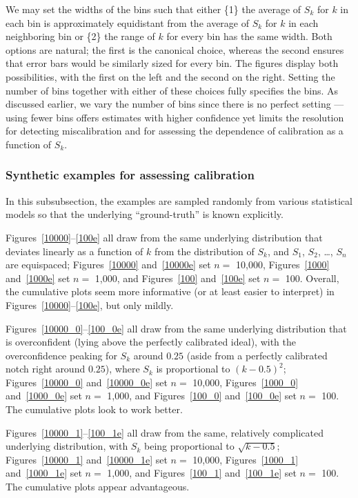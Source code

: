 \documentclass{article}
\begin{document}
We may set the widths of the bins such that either
\{1\} the average of $S_k$ for $k$ in each bin is approximately equidistant
from the average of $S_k$ for $k$ in each neighboring bin or
\{2\} the range of $k$ for every bin has the same width.
Both options are natural; the first is the canonical choice,
whereas the second ensures that error bars would be similarly sized
for every bin. The figures display both possibilities,
with the first on the left and the second on the right.
Setting the number of bins together with either of these choices
fully specifies the bins. As discussed earlier, we vary the number of bins
since there is no perfect setting --- using fewer bins offers estimates
with higher confidence yet limits the resolution for detecting miscalibration
and for assessing the dependence of calibration as a function of $S_k$.


\subsubsection{Synthetic examples for assessing calibration}
\label{asynthetic}

In this subsubsection, the examples are sampled randomly
from various statistical models so that the underlying ``ground-truth''
is known explicitly.

Figures~\ref{10000}--\ref{100e} all draw from the same underlying distribution
that deviates linearly as a function of $k$ from the distribution of $S_k$,
and $S_1$, $S_2$, \dots, $S_n$ are equispaced;
Figures~\ref{10000} and~\ref{10000e} set $n =$ 10,000,
Figures~\ref{1000} and~\ref{1000e} set $n =$ 1,000,
and Figures~\ref{100} and~\ref{100e} set $n =$ 100.
Overall, the cumulative plots seem more informative
(or at least easier to interpret) in Figures~\ref{10000}--\ref{100e},
but only mildly.

Figures~\ref{10000_0}--\ref{100_0e} all draw
from the same underlying distribution that is overconfident
(lying above the perfectly calibrated ideal),
with the overconfidence peaking for $S_k$ around $0.25$
(aside from a perfectly calibrated notch right around $0.25$),
where $S_k$ is proportional to $(k-0.5)^2$;
Figures~\ref{10000_0} and~\ref{10000_0e} set $n =$ 10,000,
Figures~\ref{1000_0} and~\ref{1000_0e} set $n =$ 1,000,
and Figures~\ref{100_0} and~\ref{100_0e} set $n =$ 100.
The cumulative plots look to work better.

Figures~\ref{10000_1}--\ref{100_1e} all draw
from the same, relatively complicated underlying distribution,
with $S_k$ being proportional to $\sqrt{k-0.5}$;
Figures~\ref{10000_1} and~\ref{10000_1e} set $n =$ 10,000,
Figures~\ref{1000_1} and~\ref{1000_1e} set $n =$ 1,000,
and Figures~\ref{100_1} and~\ref{100_1e} set $n =$ 100.
The cumulative plots appear advantageous.
\end{document}
